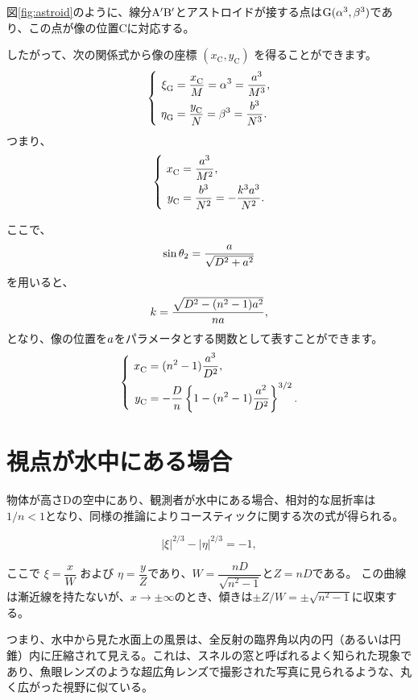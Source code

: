 \documentclass[twocolumn]{article}
\begin{document}
	図\ref{fig:astroid}のように、線分${\mathrm{{A^{\prime}}{B^{\prime}}}}$とアストロイドが接する点は$\mathrm{G}({\alpha}^3, {\beta}^3)$であり、この点が像の位置$\mathrm{C}$に対応する。
	
	したがって、次の関係式から像の座標 $(x_{\mathrm{C}}^{}, y_{\mathrm{C}}^{})$ を得ることができます。
	$$ \left\{ 
	\begin{aligned}
		\xi_{\mathrm{G}}^{} &= \dfrac{x_{\mathrm{C}}^{}}{M} = \greeka^3 = \dfrac{\romana^3}{M^3},\\
		\eta_{\mathrm{G}}^{} &= \dfrac{y_{\mathrm{C}}^{}}{N} = \greekb^3 = \dfrac{\romanb^3}{N^3}.
	\end{aligned}
	\right.$$
	つまり、
	$$ \left\{ 
	\begin{aligned}
		x_{\mathrm{C}}^{} &= \dfrac{\romana^3}{M^2},\\
		y_{\mathrm{C}}^{} &= \dfrac{\romanb^3}{N^2}=-\dfrac{k^3\romana^3}{N^2}.
	\end{aligned}
	\right.$$
	
	ここで、
	$$\sin\theta_2 = \dfrac{{a}}{\sqrt{D^2+{a}^2}}$$
	を用いると、
	$$k = \dfrac{\sqrt{D^2-(n^2-1){a}^2}}{n{a}},$$
	となり、像の位置を${a}$をパラメータとする関数として表すことができます。
	$$ \left\{ 
	\begin{aligned}
		x_{\mathrm{C}}^{} &= (n^2-1)\dfrac{\romana^3}{D^2},\\
		y_{\mathrm{C}}^{} 
		&=-\dfrac{D}{n}\left\{ 1-(n^2-1)\dfrac{\romana^2}{D^2} \right\}^{3/2}.
	\end{aligned}
	\right.$$
	
	\section{視点が水中にある場合}
	
	物体が高さDの空中にあり、観測者が水中にある場合、相対的な屈折率は$1/n < 1$となり、同様の推論によりコースティックに関する次の式が得られる。
	
	$$ \left| \xi \right|^{2/3} - \left| \eta \right|^{2/3} = -1, $$
	
	ここで $\xi = \dfrac{x}{W} $ および $\eta = \dfrac{y}{Z}$であり、$W = \dfrac{nD}{\sqrt{n^2-1}}$と$Z = nD$である。	
	この曲線は漸近線を持たないが、$x \to \pm\infty$のとき、傾きは$\pm Z/W = \pm \sqrt{n^2-1}$に収束する。
	
	つまり、水中から見た水面上の風景は、全反射の臨界角以内の円（あるいは円錐）内に圧縮されて見える。これは、スネルの窓と呼ばれるよく知られた現象であり、魚眼レンズのような超広角レンズで撮影された写真に見られるような、丸く広がった視野に似ている。
	
\end{document}
